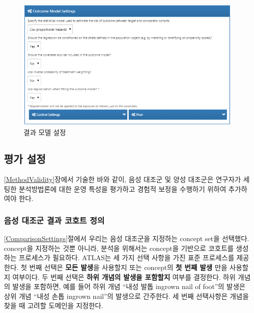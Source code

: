 \documentclass[10.5pt]{book}
\theoremstyle{definition}
\theoremstyle{definition}
\theoremstyle{definition}
\theoremstyle{remark}
\begin{document}
\begin{figure}

{\centering \includegraphics[width=1\linewidth]{images/PopulationLevelEstimation/outcomeModelSettings} 

}

\caption{결과 모델 설정}\label{fig:outcomeModelSettings}
\end{figure}

\subsection{평가 설정}\label{evaluationSettings}

\ref{MethodValidity}장에서 기술한 바와 같이, 음성 대조군 및 양성
대조군은 연구자가 세팅한 분석방법론에 대한 운영 특성을 평가하고 경험적
보정을 수행하기 위하여 추가하여야 한다.

\subsubsection*{음성 대조군 결과 코호트 정의}\label{----}

\ref{ComparisonSettings}절에서 우리는 음성 대조군을 지정하는 concept
set을 선택했다. concept을 지정하는 것뿐 아니라, 분석을 위해서는
concept을 기반으로 코호트를 생성하는 프로세스가 필요하다. ATLAS는 세
가지 선택 사항을 가진 표준 프로세스를 제공한다. 첫 번째 선택은
\textbf{모든 발생}을 사용할지 또는 concept의 \textbf{첫 번째 발생} 만을
사용할지 여부이다. 두 번째 선택은 \textbf{하위 개념의 발생을 포함할지}
여부를 결정한다. 하위 개념의 발생을 포함하면, 예를 들어 하위 개념 ``내성
발톱 ingrown nail of foot''의 발생은 상위 개념 ``내성 손톱 ingrown
nail''의 발생으로 간주한다. 세 번째 선택사항은 개념을 찾을 때 고려할
도메인을 지정한다.
\end{document}
